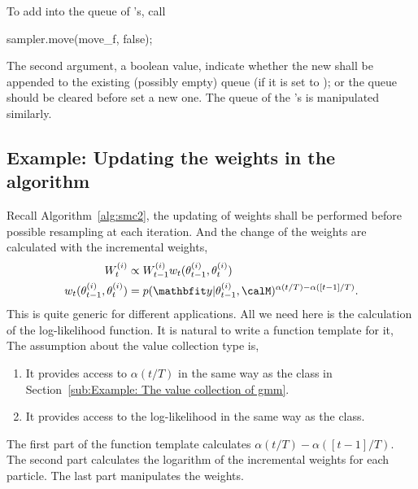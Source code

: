 To add  into the queue of 's, call
\begin{cppcode}
sampler.move(move_f, false);
\end{cppcode}
The second argument, a boolean value, indicate whether the new
 shall be appended to the existing (possibly empty) queue (if
it is set to ); or the queue should be cleared before set a
new one. The queue of the 's is manipulated similarly.

\subsection{Example: Updating the weights in the \smc[2] algorithm}
\label{sub:Example: Updating the weights in the SMC2 algorithm}

Recall Algorithm~\ref{alg:smc2}, the updating of weights shall be performed
before possible resampling at each iteration. And the change of the weights
are calculated with the incremental weights,
\begin{align*}
  W_t^{(i)} &\propto W_{t-1}^{(i)} w_t(\theta_{t-1}^{(i)}, \theta_t^{(i)}) \\
  w_t(\theta_{t-1}^{(i)}, \theta_t^{(i)}) &=
  p(\data|\theta_{t-1}^{(i)},\calM)^{\alpha(t/T) - \alpha([t-1]/T)}.
\end{align*}
This is quite generic for different applications. All we need here is the
calculation of the log-likelihood function. It is natural to write a function
template for it,
The assumption about the value collection type  is,
\begin{enumerate}
  \item It provides access to $\alpha(t/T)$ in the same way as the
     class in Section~\ref{sub:Example: The value collection of
      gmm}.
  \item It provides access to the log-likelihood in the same way as the
     class.
\end{enumerate}
The first part of the function template  calculates
$\alpha(t/T) - \alpha([t-1]/T)$. The second part calculates the logarithm of
the incremental weights for each particle. The last part manipulates the
weights.

